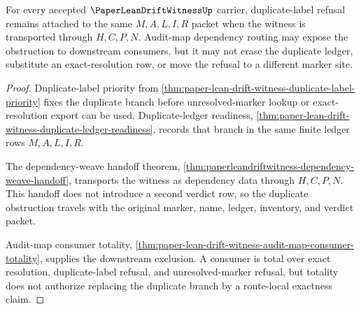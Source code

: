 \begin{theorem}
\label{thm:paper-lean-drift-witness-duplicate-obstruction-route-preservation}
For every accepted $\PaperLeanDriftWitnessUp$ carrier, duplicate-label refusal remains attached to the same $M,A,L,I,R$ packet when the witness is transported through $H,C,P,N$. Audit-map dependency routing may expose the obstruction to downstream consumers, but it may not erase the duplicate ledger, substitute an exact-resolution row, or move the refusal to a different marker site.
\end{theorem}
\begin{proof}
Duplicate-label priority from \autoref{thm:paper-lean-drift-witness-duplicate-label-priority} fixes the duplicate branch before unresolved-marker lookup or exact-resolution export can be used. Duplicate-ledger readiness, \autoref{thm:paper-lean-drift-witness-duplicate-ledger-readiness}, records that branch in the same finite ledger rows $M,A,L,I,R$.

The dependency-weave handoff theorem, \autoref{thm:paperleandriftwitness-dependency-weave-handoff}, transports the witness as dependency data through $H,C,P,N$. This handoff does not introduce a second verdict row, so the duplicate obstruction travels with the original marker, name, ledger, inventory, and verdict packet.

Audit-map consumer totality, \autoref{thm:paper-lean-drift-witness-audit-map-consumer-totality}, supplies the downstream exclusion. A consumer is total over exact resolution, duplicate-label refusal, and unresolved-marker refusal, but totality does not authorize replacing the duplicate branch by a route-local exactness claim.
\end{proof}

